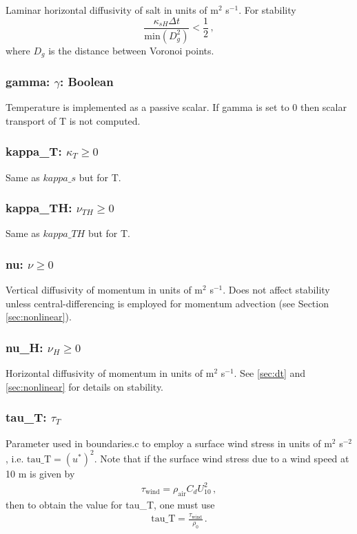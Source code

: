 Laminar horizontal diffusivity of salt in units of m$^2$ s$^{-1}$.  For stability 
\[
\frac{\kappa_{sH}\Delta t}{\mbox{min}(D_g^2)}<\frac{1}{2}\,,
\]
where $D_g$ is the distance between Voronoi points.  

\subsubsection{gamma: $\gamma$: Boolean}

Temperature is implemented as a passive scalar.  If gamma is set to 0 then scalar
transport of T is not computed.

\subsubsection{kappa\_T: $\kappa_T\ge 0$}

Same as $kappa\_s$ but for T.

\subsubsection{kappa\_TH: $\nu_{TH}\ge 0$}

Same as $kappa\_TH$ but for T.

\subsubsection{nu: $\nu\ge 0$}

Vertical diffusivity of momentum in units of m$^2$ s$^{-1}$.  Does not affect stability unless
central-differencing is employed for momentum advection (see Section \ref{sec:nonlinear}).

\subsubsection{nu\_H: $\nu_{H}\ge 0$}

Horizontal diffusivity of momentum in units of m$^2$ s$^{-1}$.  See \ref{sec:dt} and \ref{sec:nonlinear}
for details on stability.

\subsubsection{tau\_T: $\tau_T$}

Parameter used in boundaries.c to employ a surface wind stress in units of m$^2$ s$^{-2}$,
i.e. $\mbox{tau\_T}=(u^*)^2$.  Note that if the surface wind stress due to a wind speed at 10 m
is given by
\begin{eqnarray*}
\tau_{\mbox{wind}} = \rho_{\mbox{air}}C_d U_{10}^2\,,
\end{eqnarray*}
then to obtain the value for \mbox{tau\_T}, one must use
\begin{eqnarray*}
\mbox{tau\_T} = \frac{\tau_{\mbox{wind}}}{\rho_0}\,.
\end{eqnarray*}

